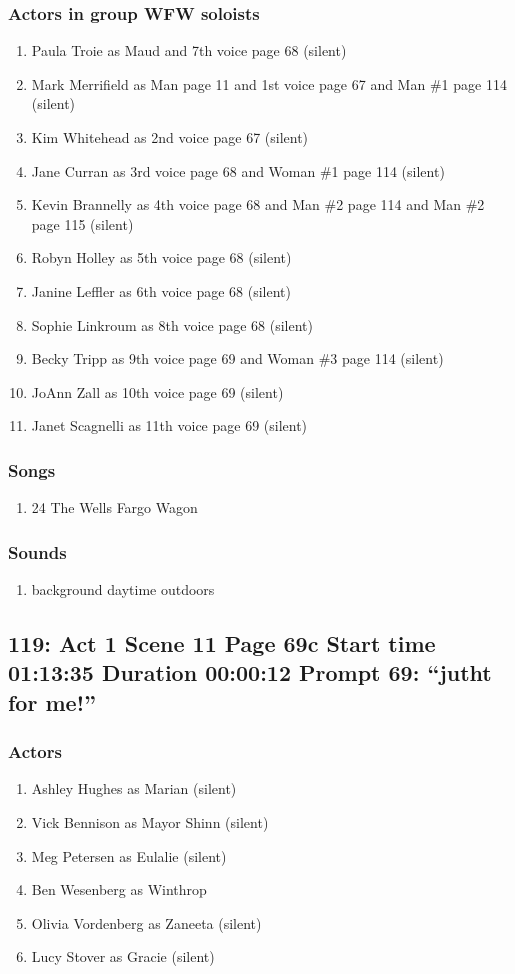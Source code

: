 \subsubsection{Actors in group WFW soloists}
\begin{enumerate}
\item Paula Troie as Maud and 7th voice page 68 (silent)
\item Mark Merrifield as Man page 11 and 1st voice page 67 and Man \#1 page 114 (silent)
\item Kim Whitehead as 2nd voice page 67 (silent)
\item Jane Curran as 3rd voice page 68 and Woman \#1 page 114 (silent)
\item Kevin Brannelly as 4th voice page 68 and Man \#2 page 114 and Man \#2 page 115 (silent)
\item Robyn Holley as 5th voice page 68 (silent)
\item Janine Leffler as 6th voice page 68 (silent)
\item Sophie Linkroum as 8th voice page 68 (silent)
\item Becky Tripp as 9th voice page 69 and Woman \#3 page 114 (silent)
\item JoAnn Zall as 10th voice page 69 (silent)
\item Janet Scagnelli as 11th voice page 69 (silent)
\end{enumerate}

\subsubsection{Songs}
\begin{enumerate}
\item 24 The Wells Fargo Wagon
\end{enumerate}\subsubsection{Sounds}
\begin{enumerate}
\item background daytime outdoors
\end{enumerate}
\subsection{119: Act 1 Scene 11 Page 69c Start time 01:13:35 Duration 00:00:12 Prompt 69: ``jutht for me!''}

\subsubsection{Actors}
\begin{enumerate}
\item Ashley Hughes as Marian (silent)
\item Vick Bennison as Mayor Shinn (silent)
\item Meg Petersen as Eulalie (silent)
\item Ben Wesenberg as Winthrop
\item Olivia Vordenberg as Zaneeta (silent)
\item Lucy Stover as Gracie (silent)
\end{enumerate}
